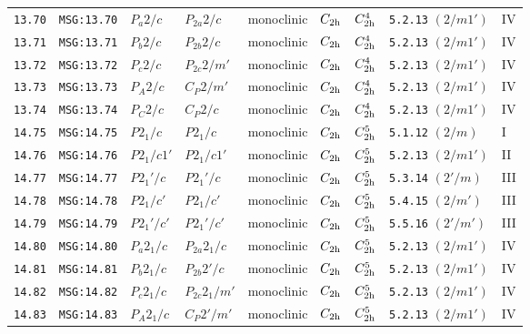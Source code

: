 \documentclass[fleqn,10pt]{jsarticle}
\begin{document}
\begin{center}
\begin{longtable}{lllllllll}
\texttt{13.70} & \texttt{MSG:13.70} & $P_{a}2/c$ & $P_{2a}2/c$ & monoclinic & $C_{\rm 2h}$ & $C_{\rm 2h}^{4}$ & \texttt{5.2.13} $(2/m1')$ & IV \\
\texttt{13.71} & \texttt{MSG:13.71} & $P_{b}2/c$ & $P_{2b}2/c$ & monoclinic & $C_{\rm 2h}$ & $C_{\rm 2h}^{4}$ & \texttt{5.2.13} $(2/m1')$ & IV \\
\texttt{13.72} & \texttt{MSG:13.72} & $P_{c}2/c$ & $P_{2c}2/m'$ & monoclinic & $C_{\rm 2h}$ & $C_{\rm 2h}^{4}$ & \texttt{5.2.13} $(2/m1')$ & IV \\
\texttt{13.73} & \texttt{MSG:13.73} & $P_{A}2/c$ & $C_{P}2/m'$ & monoclinic & $C_{\rm 2h}$ & $C_{\rm 2h}^{4}$ & \texttt{5.2.13} $(2/m1')$ & IV \\
\texttt{13.74} & \texttt{MSG:13.74} & $P_{C}2/c$ & $C_{P}2/c$ & monoclinic & $C_{\rm 2h}$ & $C_{\rm 2h}^{4}$ & \texttt{5.2.13} $(2/m1')$ & IV \\ \hline
\texttt{14.75} & \texttt{MSG:14.75} & $P2_{1}/c$ & $P2_{1}/c$ & monoclinic & $C_{\rm 2h}$ & $C_{\rm 2h}^{5}$ & \texttt{5.1.12} $(2/m)$ & I \\
\texttt{14.76} & \texttt{MSG:14.76} & $P2_{1}/c1'$ & $P2_{1}/c1'$ & monoclinic & $C_{\rm 2h}$ & $C_{\rm 2h}^{5}$ & \texttt{5.2.13} $(2/m1')$ & II \\
\texttt{14.77} & \texttt{MSG:14.77} & $P2_{1}'/c$ & $P2_{1}'/c$ & monoclinic & $C_{\rm 2h}$ & $C_{\rm 2h}^{5}$ & \texttt{5.3.14} $(2'/m)$ & III \\
\texttt{14.78} & \texttt{MSG:14.78} & $P2_{1}/c'$ & $P2_{1}/c'$ & monoclinic & $C_{\rm 2h}$ & $C_{\rm 2h}^{5}$ & \texttt{5.4.15} $(2/m')$ & III \\
\texttt{14.79} & \texttt{MSG:14.79} & $P2_{1}'/c'$ & $P2_{1}'/c'$ & monoclinic & $C_{\rm 2h}$ & $C_{\rm 2h}^{5}$ & \texttt{5.5.16} $(2'/m')$ & III \\
\texttt{14.80} & \texttt{MSG:14.80} & $P_{a}2_{1}/c$ & $P_{2a}2_{1}/c$ & monoclinic & $C_{\rm 2h}$ & $C_{\rm 2h}^{5}$ & \texttt{5.2.13} $(2/m1')$ & IV \\
\texttt{14.81} & \texttt{MSG:14.81} & $P_{b}2_{1}/c$ & $P_{2b}2'/c$ & monoclinic & $C_{\rm 2h}$ & $C_{\rm 2h}^{5}$ & \texttt{5.2.13} $(2/m1')$ & IV \\
\texttt{14.82} & \texttt{MSG:14.82} & $P_{c}2_{1}/c$ & $P_{2c}2_{1}/m'$ & monoclinic & $C_{\rm 2h}$ & $C_{\rm 2h}^{5}$ & \texttt{5.2.13} $(2/m1')$ & IV \\
\texttt{14.83} & \texttt{MSG:14.83} & $P_{A}2_{1}/c$ & $C_{P}2'/m'$ & monoclinic & $C_{\rm 2h}$ & $C_{\rm 2h}^{5}$ & \texttt{5.2.13} $(2/m1')$ & IV \\

\end{longtable}
\end{center}
\end{document}
